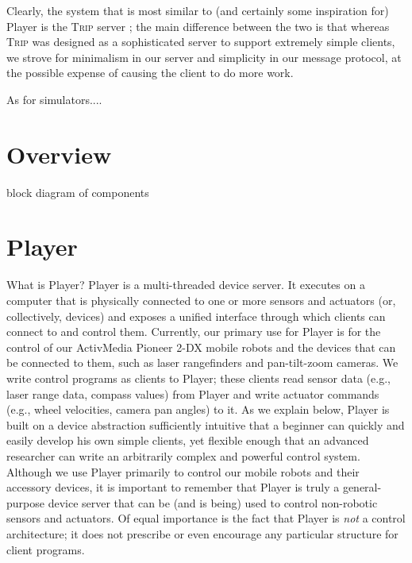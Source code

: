 \documentclass[]{article}
\begin{document}
Clearly, the system
that is most similar to (and certainly some inspiration for) Player
is the {\scshape Trip} server \cite{Jennings98}; the main difference between
the two is that whereas {\scshape Trip} was designed as a sophisticated
server to support extremely simple clients, we strove 
for minimalism in our server and simplicity in our message protocol, 
at the possible expense of causing the client to do more work.


As for simulators....

\section{Overview}

block diagram of components

\section{Player}
What is Player? Player is a multi-threaded device server.  It 
executes on a computer that is physically connected to one or more 
sensors and actuators (or, collectively, devices) and exposes a 
unified interface through which clients can connect to and 
control them.  Currently, our primary use for Player is for the control
of our ActivMedia
Pioneer 2-DX mobile robots and the devices that can be connected to them,
such as laser rangefinders and pan-tilt-zoom cameras.  We write control
programs as clients to Player; these clients read sensor data
(e.g., laser range data, compass values) from Player and write actuator 
commands (e.g., wheel velocities, camera pan angles) to it.  As we
explain below, Player is built on a device abstraction sufficiently intuitive
that a beginner can quickly and easily develop his own simple clients, 
yet flexible enough that an advanced researcher can write an arbitrarily
complex and powerful control system.
Although we use Player primarily to control our mobile robots and
their accessory devices, it is important to remember that Player is truly
a general-purpose device server that can be (and is being) used to control
non-robotic sensors and actuators.  Of equal importance is the fact
that Player is {\sl not} a control architecture; it does not prescribe
or even encourage any particular structure for client programs.
\end{document}
